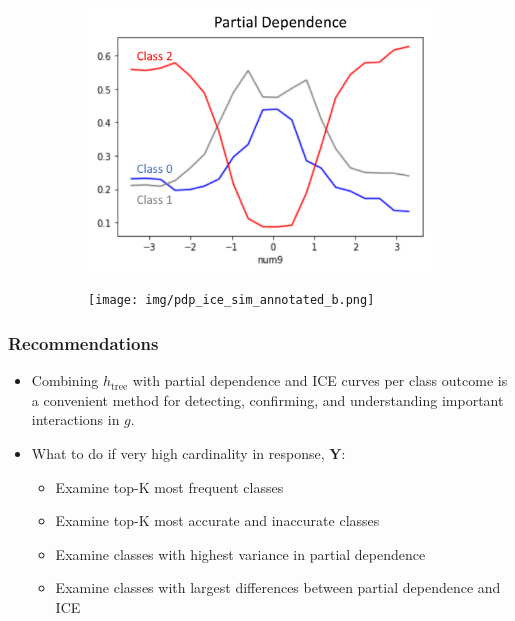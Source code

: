 \documentclass{article}
\begin{document}
\begin{figure}[H]
	\begin{subfigure}[tb]{.5\textwidth}
		\begin{center}
			\includegraphics[width=\linewidth]{img/pdp_ice_sim_annotated_a.png}
			\caption{}
			\label{fig:global_shap}
		\end{center}
	\end{subfigure}%
	\begin{subfigure}[tb]{.5\textwidth}
		\begin{center}
			\texttt{[image: img/pdp\_ice\_sim\_annotated\_b.png]}
			\caption{}
			\label{fig:global_shap}
		\end{center}
	\end{subfigure}%
\end{figure}

\FloatBarrier

\subsubsection{Recommendations}

\begin{itemize}

\item Combining $h_{\text{tree}}$ with partial dependence and ICE curves per class outcome is a convenient method for detecting, confirming, and understanding important interactions in $g$.

\item What to do if very high cardinality in response, $\mathbf{Y}$:

\begin{itemize}

  \item Examine top-K most frequent classes
  \item Examine top-K most accurate and inaccurate classes
  \item Examine classes with highest variance in partial dependence
  \item Examine classes with largest differences between partial dependence and ICE
  
\end{itemize}

\end{itemize}
\end{document}
